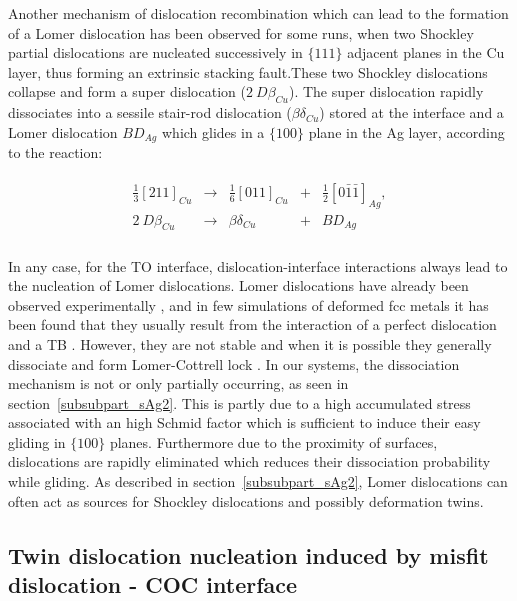 \documentclass[final,3p,times,twocolumn]{elsarticle}
\begin{document}
Another mechanism of dislocation recombination which can lead to the formation of a Lomer dislocation has been observed for some runs, when two Shockley partial dislocations are nucleated successively in $\lbrace111\rbrace$ adjacent planes in the Cu layer, thus forming an extrinsic stacking fault.These two Shockley dislocations collapse and form a super dislocation ($ 2~D\beta_{Cu} $).
The super dislocation rapidly dissociates into a sessile stair-rod dislocation ($\beta\delta_{Cu}$) stored at the interface and a Lomer dislocation $ BD_{Ag} $ which glides in a $\lbrace100\rbrace$ plane in the Ag layer, according to the reaction:

\begin{eqnarray}\label{4}
	\begin{array}{ccccc}
\frac{1}{3}\left[211\right]_{Cu} &\rightarrow & \frac{1}{6}\left[011\right]_{Cu} &+& \frac{1}{2}\left[0\bar{1}\bar{1}\right]_{Ag}, \\
2~D\beta_{Cu} &\rightarrow & \beta\delta_{Cu} &+& BD_{Ag} \\
	\end{array}
\end{eqnarray}

In any case, for the TO interface, dislocation-interface interactions always lead to the nucleation of Lomer dislocations. Lomer dislocations have already been observed experimentally \cite{bonneville90PML,mills89PMA}, and in few simulations of deformed fcc metals it has been found that they usually result from the interaction of a perfect dislocation and a TB \cite{wu09AM,sansoz07NL}. However, they are not stable and when it is possible they generally dissociate and form Lomer-Cottrell lock \cite{hirth82book,wu09AM}. In our systems, the dissociation mechanism is not or only partially occurring, as seen in section~\ref{subsubpart_sAg2}. This is partly due to a high accumulated stress associated with an high Schmid factor which is sufficient to induce their easy gliding in $\lbrace100\rbrace$ planes. Furthermore due to the proximity of surfaces, dislocations are rapidly eliminated which reduces their dissociation probability while gliding. As described in section~\ref{subsubpart_sAg2}, Lomer dislocations can often act as sources for Shockley dislocations and possibly deformation twins. 

	\subsection{Twin dislocation nucleation induced by misfit dislocation - COC interface}\label{subsubpart_twin}
	
\end{document}
